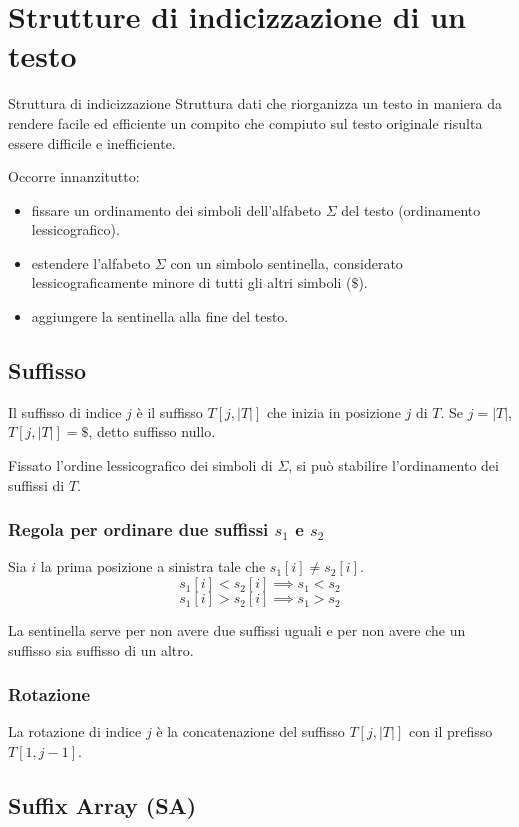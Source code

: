 \section{Strutture di indicizzazione di un testo}
\begin{teorema}{Struttura di indicizzazione}{}
Struttura dati che riorganizza un testo in maniera da rendere facile ed efficiente un compito che compiuto sul testo originale risulta essere difficile e inefficiente.
\end{teorema}
Occorre innanzitutto: 
\begin{itemize}
    \item fissare un ordinamento dei simboli dell’alfabeto $\Sigma$ del testo (ordinamento lessicografico).
    \item estendere l’alfabeto $\Sigma$ con un simbolo sentinella, considerato lessicograficamente minore di tutti gli altri simboli ($\$$).
    \item aggiungere la sentinella alla fine del testo.
\end{itemize}

\subsection{Suffisso}
Il suffisso di indice $j$ è il suffisso $T[j, |T|]$ che inizia in posizione $j$ di $T$.
Se $j=|T|$, $T[j, |T|] = \$$, detto suffisso nullo.

Fissato l’ordine lessicografico dei simboli di $\Sigma$, si può stabilire l’ordinamento dei suffissi di $T$.

\subsubsection{Regola per ordinare due suffissi \texorpdfstring{$s_1$}{} e \texorpdfstring{$s_2$}{}}
Sia $i$ la prima posizione a sinistra tale che $s_1[i] \neq s_2[i]$.
\[s_1[i] < s_2[i] \implies s_1 < s_2\]
\[s_1[i] > s_2[i] \implies s_1 > s_2\]

La sentinella serve per non avere due suffissi uguali e per non avere che un suffisso sia suffisso di un altro.

\subsubsection{Rotazione}
La rotazione di indice $j$ è la concatenazione del suffisso $T[j, |T|]$ con il prefisso $T[1, j-1]$.

\subsection{Suffix Array (SA)}

